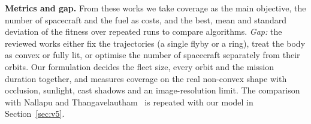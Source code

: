 \textbf{Metrics and gap.} From these works we take coverage as the main objective, the number of
spacecraft and the fuel as costs, and the best, mean and standard deviation of the fitness over
repeated runs to compare algorithms. \emph{Gap:} the reviewed works either fix the trajectories
(a single flyby or a ring), treat the body as convex or fully lit, or optimise the number of
spacecraft separately from their orbits. Our formulation decides the fleet size, every orbit and
the mission duration together, and measures coverage on the real non-convex shape with occlusion,
sunlight, cast shadows and an image-resolution limit. The comparison with
Nallapu and Thangavelautham~\cite{nallapu2019} is repeated with our model in
Section~\ref{sec:v5}.
